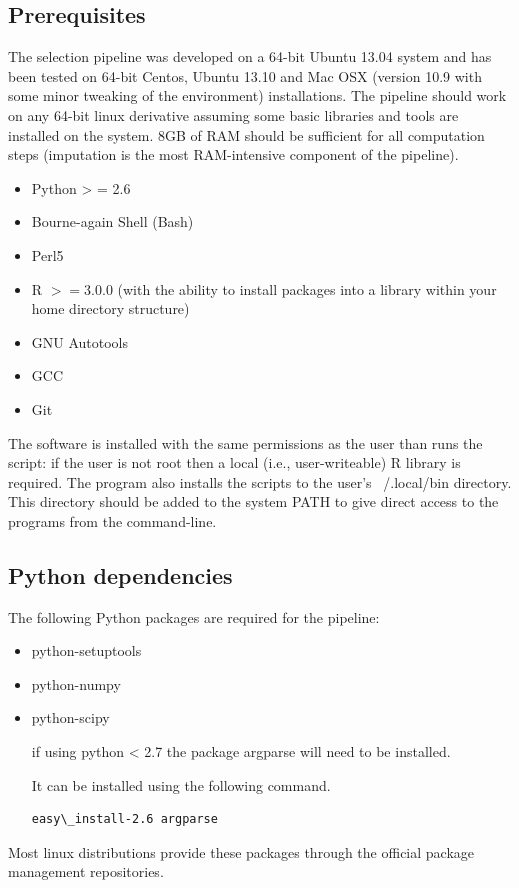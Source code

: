 \documentclass[a4paper,10pt]{article}
\begin{document}
\subsection{Prerequisites}
The selection pipeline was developed on a 64-bit Ubuntu 13.04 system
and has been tested on 64-bit Centos, Ubuntu 13.10 and Mac OSX (version 10.9 with some minor tweaking of the environment)
installations. The pipeline should work on any 64-bit linux derivative
assuming some basic libraries and tools are installed on the
system. 8GB of RAM should be sufficient for all computation steps
(imputation is the most RAM-intensive component of the pipeline).
\begin{itemize}
\item Python > = 2.6 
\item Bourne-again Shell (Bash)
\item Perl5
\item R \( >= 3.0.0 \) (with the ability to install packages into a
  library within your home directory structure)
\item GNU Autotools
\item GCC 
\item Git
\end{itemize}
The software is installed with the same permissions as the user than
runs the script: if the user is not root then a local (i.e.,
user-writeable) R library is
required. The program also installs the scripts to the user's
~/.local/bin directory.  This directory should be added to the system
PATH to give direct access to the programs from the command-line. 
 
\subsection{Python dependencies}
The following Python packages are required for the pipeline:
\begin{itemize}
\item python-setuptools
\item python-numpy
\item python-scipy

if using python < 2.7 the package argparse will need to be installed.

It can be installed using the following command.

\begin{verbatim}
easy\_install-2.6 argparse
\end{verbatim}
\end{itemize}
Most linux distributions provide these packages through the official
package management repositories.
\end{document}
